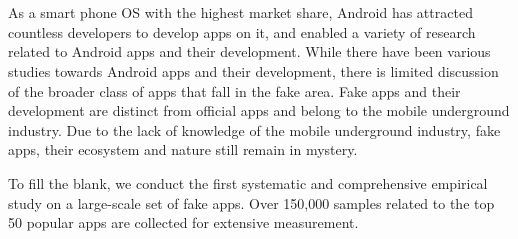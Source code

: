 \newpage


\chapter*{}
\vspace{-5mm}

As a smart phone OS with the highest market share, Android has attracted countless developers to develop apps on it, and enabled a variety of research related to Android apps and their development.
While there have been various studies towards Android apps and their development, there is limited discussion of the broader class of apps that fall in the fake area.
Fake apps and their development are distinct from official apps and belong to the mobile underground industry.
Due to the lack of knowledge of the mobile underground industry, fake apps, their ecosystem and nature still remain in mystery.

To fill the blank, we conduct the first systematic and comprehensive empirical study on a large-scale set of fake apps.
Over 150,000 samples related to the top 50 popular apps are collected for extensive measurement.

